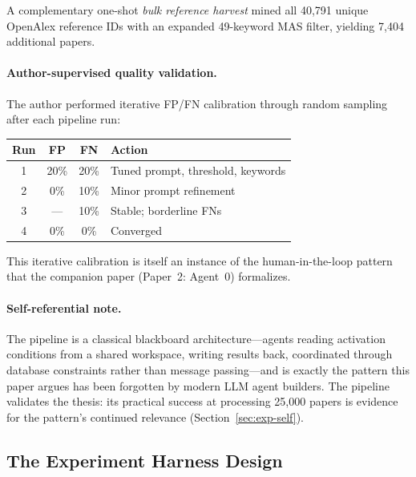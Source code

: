 \documentclass{article}
\begin{document}
\noindent
A complementary one-shot \emph{bulk reference harvest} mined all 40,791 unique OpenAlex
reference IDs with an expanded 49-keyword MAS filter, yielding 7,404 additional papers.

\paragraph{Author-supervised quality validation.}
The author performed iterative FP/FN calibration through random sampling after each
pipeline run:

\begin{center}
\small
\begin{tabular}{@{} c c c p{3.2cm} @{}}
\toprule
\textbf{Run} & \textbf{FP} & \textbf{FN} & \textbf{Action} \\
\midrule
1 & 20\% & 20\% & Tuned prompt, threshold, keywords \\
2 & 0\% & 10\% & Minor prompt refinement \\
3 & --- & 10\% & Stable; borderline FNs \\
4 & 0\% & 0\% & Converged \\
\bottomrule
\end{tabular}
\end{center}

\noindent
This iterative calibration is itself an instance of the human-in-the-loop pattern that
the companion paper (Paper~2: Agent~0) formalizes.

\paragraph{Self-referential note.}
The pipeline is a classical blackboard architecture---agents reading activation
conditions from a shared workspace, writing results back, coordinated through database
constraints rather than message passing---and is exactly the pattern this paper argues
has been forgotten by modern LLM agent builders. The pipeline validates the thesis:
its practical success at processing 25,000 papers is evidence for the pattern's
continued relevance (Section~\ref{sec:exp-self}).

\subsection{The Experiment Harness Design}
\label{sec:meth-harness}

%
\end{document}
